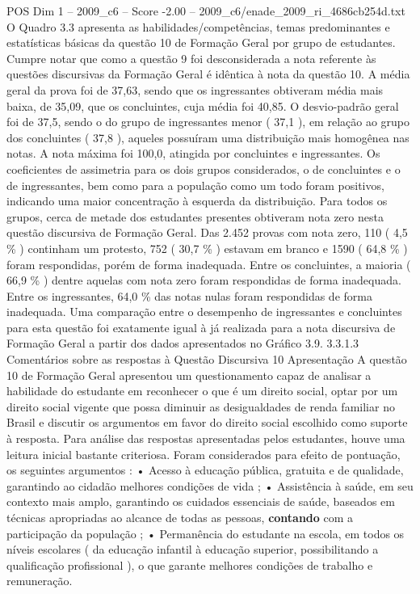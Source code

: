 \begin{textsample}{POS Dim 1 – 2009\_c6 – Score -2.00 – 2009\_c6/enade\_2009\_ri\_4686cb254d.txt}
O Quadro 3.3 apresenta as habilidades/competências, temas predominantes e estatísticas básicas da questão 10 de Formação Geral por grupo de estudantes.
Cumpre notar que como a questão 9 foi desconsiderada a nota referente às questões discursivas da Formação Geral é idêntica à nota da questão 10.
A média geral da prova foi de 37,63, sendo que os ingressantes obtiveram média mais baixa, de 35,09, que os concluintes, cuja média foi 40,85.
O desvio-padrão geral foi de 37,5, sendo o do grupo de ingressantes menor ( 37,1 ), em relação ao grupo dos concluintes ( 37,8 ), aqueles possuíram uma distribuição mais homogênea nas notas.
A nota máxima foi 100,0, atingida por concluintes e ingressantes.
Os coeficientes de assimetria para os dois grupos considerados, o de concluintes e o de ingressantes, bem como para a população como um todo foram positivos, indicando uma maior concentração à esquerda da distribuição.
Para todos os grupos, cerca de metade dos estudantes presentes obtiveram nota zero nesta questão discursiva de Formação Geral.
Das 2.452 provas com nota zero, 110 ( 4,5 \% ) continham um protesto, 752 ( 30,7 \% ) estavam em branco e 1590 ( 64,8 \% ) foram respondidas, porém de forma inadequada.
Entre os concluintes, a maioria ( 66,9 \% ) dentre aquelas com nota zero foram respondidas de forma inadequada.
Entre os ingressantes, 64,0 \% das notas nulas foram respondidas de forma inadequada.
Uma comparação entre o desempenho de ingressantes e concluintes para esta questão foi exatamente igual à já realizada para a nota discursiva de Formação Geral a partir dos dados apresentados no Gráfico 3.9. 3.3.1.3 Comentários sobre as respostas à Questão Discursiva 10 Apresentação A questão 10 de Formação Geral apresentou um questionamento capaz de analisar a habilidade do estudante em reconhecer o que é um direito social, optar por um direito social vigente que possa diminuir as desigualdades de renda familiar no Brasil e discutir os argumentos em favor do direito social escolhido como suporte à resposta.
Para análise das respostas apresentadas pelos estudantes, houve uma leitura inicial bastante criteriosa.
Foram considerados para efeito de pontuação, os seguintes argumentos : • Acesso à educação pública, gratuita e de qualidade, garantindo ao cidadão melhores condições de vida ; • Assistência à saúde, em seu contexto mais amplo, garantindo os cuidados essenciais de saúde, baseados em técnicas apropriadas ao alcance de todas as pessoas, \textbf{contando} com a participação da população ; • Permanência do estudante na escola, em todos os níveis escolares ( da educação infantil à educação superior, possibilitando a qualificação profissional ), o que garante melhores condições de trabalho e remuneração.

\end{textsample}
